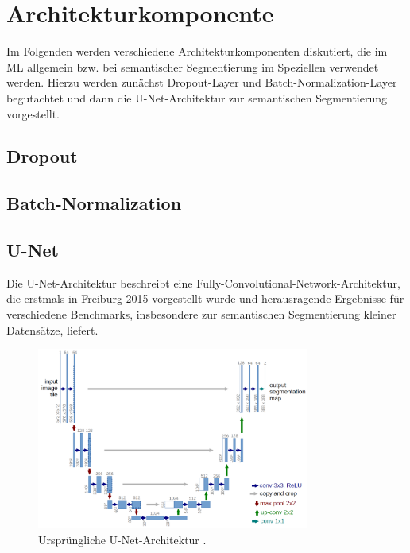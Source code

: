 \section{Architekturkomponente}

Im Folgenden werden verschiedene Architekturkomponenten diskutiert, die im \ac{ML} allgemein 
bzw. bei semantischer Segmentierung im Speziellen verwendet werden. Hierzu werden zunächst Dropout-Layer 
und Batch-Normalization-Layer begutachtet und dann die U-Net-Architektur zur semantischen Segmentierung vorgestellt. 

\subsection{Dropout}

\subsection{Batch-Normalization}

\subsection{U-Net}

Die U-Net-Architektur beschreibt eine Fully-Convolutional-Network-Architektur, die erstmals in Freiburg 2015 vorgestellt wurde 
und herausragende Ergebnisse für verschiedene Benchmarks, insbesondere zur semantischen Segmentierung kleiner Datensätze, liefert. 

\begin{figure}
	\centering
	\includegraphics[width=0.8\textwidth]{Bilder/u-net-architecture.png} 
	\caption{Ursprüngliche U-Net-Architektur \cite{Ronneberger.18052015}.}
	\label{fig:u-net-architecture}
\end{figure} 




